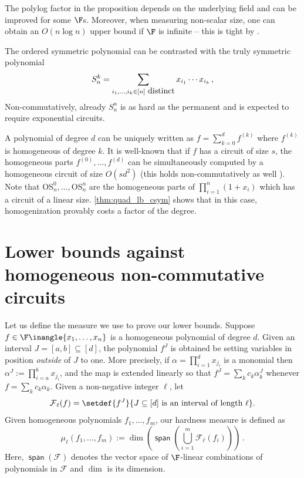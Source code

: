 \documentclass[11pt]{article}
\newcommand{\spn}{\operatorname{\mathsf{span}}}
\renewcommand{\fam}{\textbf{$\mathcal{F}$}}
\newcommand{\esym}[2]{\mathrm{OS}_{#1}^{#2}}
\begin{document}
The polylog factor in the proposition depends on the underlying field and can be improved for some $\F$s. 
Moreover, when measuring non-scalar size, one can obtain an $O(n\log n)$ upper bound if $\F$ is infinite -- this is tight by \cite{BS83}. 
 
The ordered symmetric polynomial can be contrasted with the truly symmetric polynomial 
\[ 
  S^k_n= \sum_{i_1, \dots, i_k\in [n]\hbox { distinct}} x_{i_1}\cdots x_{i_k}\,,
\]
Non-commutatively, already $S_{n}^n$ is as hard as the permanent \cite{HWY11} and is expected to require exponential circuits. 

\begin{remark} 
  A polynomial of degree $d$ can be uniquely written as $f=\sum_{k=0}^df^{(k)}$ where $f^{(k)}$ is homogeneous of degree $k$. 
  It is well-known that if $f$ has a circuit of size $s$, the homogeneous parts $f^{(0)},\dots, f^{(d)}$ can be simultaneously computed by a homogeneous circuit of size $O(sd^2)$ (this holds non-commutatively as well \cite{HWY11}). 
  Note that $\esym{n}{0},\dots, \esym{n}{n}$ are the homogeneous parts of $\prod_{i=1}^n (1+x_i)$ which has a circuit of a linear size. 
  \autoref{thm:quad_lb_csym} shows that in this case, homogenization provably costs a factor of the degree.      
\end{remark}


\section{Lower bounds against homogeneous non-commutative circuits}

Let us define the measure we use to prove our lower bounds.
Suppose $f \in \F \inangle{x_1, \ldots, x_n}$ is a homogeneous polynomial of degree $d$. 
Given an interval $J= [a,b]\subseteq [d]$, the polynomial $f^J$ is obtained be setting variables in position \emph{outside} of $J$ to one. 
More precisely, if $\alpha=\prod_{i=1}^d x_{j_i}$ is a monomial then $\alpha^J:= \prod_{i=a}^b x_{j_i}$, and the map is extended linearly so that $f^J= \sum_k c_k \alpha_k^J $ whenever $f= \sum_k c_k \alpha_k$. 
Given a non-negative integer $\ell$, let 
\[
  \fam_\ell(f) = \setdef{f^J}{J \subseteq [d] \text{ is an interval of length } \ell}.
\]
Given homogeneous polynomials $f_1,\dots, f_m$, our hardness measure is defined as 
\[
 \mu_\ell(f_1,\dots,f_m) := \dim(\spn(\bigcup_{i=1}^m \fam_\ell(f_i)))\,.
\]
Here, $\spn(\fam)$ denotes the vector space of $\F$-linear combinations of polynomials in $\fam$ and $\dim$ is its dimension. 
\end{document}
